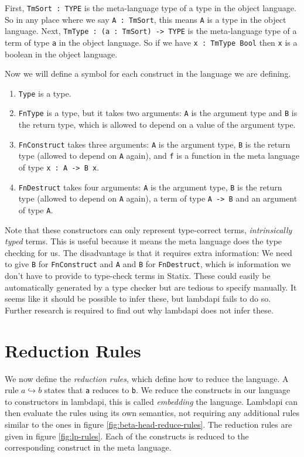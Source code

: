 First, \verb|TmSort : TYPE| is the meta-language type of a type in the object language. So in any place where we say \verb|A : TmSort|, this means \verb|A| is a type in the object language. Next, \verb|TmType : (a : TmSort) -> TYPE| is the meta-language type of a term of type \verb|a| in the object language. So if we have \verb|x : TmType Bool| then \verb|x| is a boolean in the object language. 

Now we will define a symbol for each construct in the language we are defining.
\begin{enumerate}
	\item \verb|Type| is a type.
	\item \verb|FnType| is a type, but it takes two arguments: \verb|A| is the argument type and \verb|B| is the return type, which is allowed to depend on a value of the argument type.
	\item \verb|FnConstruct| takes three arguments: \verb|A| is the argument type, \verb|B| is the return type (allowed to depend on \verb|A| again), and \verb|f| is a function in the meta language of type \verb|x : A -> B x|.
	\item \verb|FnDestruct| takes four arguments: \verb|A| is the argument type, \verb|B| is the return type (allowed to depend on \verb|A| again), a term of type \verb|A -> B| and an argument of type \verb|A|. 
\end{enumerate}

Note that these constructors can only represent type-correct terms, \emph{intrinsically typed} terms. This is useful because it means the meta language does the type checking for us. The disadvantage is that it requires extra information: We need to give \verb|B| for \verb|FnConstruct| and \verb|A| and \verb|B| for \verb|FnDestruct|, which is information we don't have to provide to type-check terms in Statix. These could easily be automatically generated by a type checker but are tedious to specify manually. It seems like it should be possible to infer these, but lambdapi fails to do so. Further research is required to find out why lambdapi does not infer these.

\section{Reduction Rules}

We now define the \emph{reduction rules}, which define how to reduce the language. A rule $a \hookrightarrow b$ states that \verb|a| reduces to \verb|b|. We reduce the constructs in our language to constructors in lambdapi, this is called \emph{embedding} the language. Lambdapi can then evaluate the rules using its own semantics, not requiring any additional rules similar to the ones in figure \ref{fig:beta-head-reduce-rules}. The reduction rules are given in figure \ref{fig:lp-rules}. Each of the constructs is reduced to the corresponding construct in the meta language.

